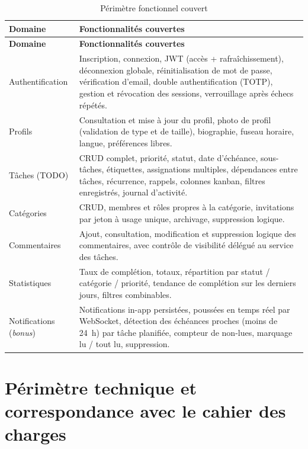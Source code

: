 \documentclass[11pt,a4paper,oneside]{report}
\begin{document}
\begin{longtable}{@{}p{4.2cm}p{10.3cm}@{}}
\caption{Périmètre fonctionnel couvert}\label{tab:perimetre}\\
\toprule
\textbf{Domaine} & \textbf{Fonctionnalités couvertes} \\
\midrule
\endfirsthead
\toprule
\textbf{Domaine} & \textbf{Fonctionnalités couvertes} \\
\midrule
\endhead
\bottomrule
\endlastfoot
Authentification &
  Inscription, connexion, JWT (accès + rafraîchissement), déconnexion globale,
  réinitialisation de mot de passe, vérification d'email, double authentification
  (TOTP), gestion et révocation des sessions, verrouillage après échecs répétés. \\
\addlinespace
Profils &
  Consultation et mise à jour du profil, photo de profil (validation de type et
  de taille), biographie, fuseau horaire, langue, préférences libres. \\
\addlinespace
Tâches (TODO) &
  CRUD complet, priorité, statut, date d'échéance, sous-tâches, étiquettes,
  assignations multiples, dépendances entre tâches, récurrence, rappels,
  colonnes kanban, filtres enregistrés, journal d'activité. \\
\addlinespace
Catégories &
  CRUD, membres et rôles propres à la catégorie, invitations par jeton à usage
  unique, archivage, suppression logique. \\
\addlinespace
Commentaires &
  Ajout, consultation, modification et suppression logique des commentaires,
  avec contrôle de visibilité délégué au service des tâches. \\
\addlinespace
Statistiques &
  Taux de complétion, totaux, répartition par statut / catégorie / priorité,
  tendance de complétion sur les derniers jours, filtres combinables. \\
\addlinespace
Notifications \newline (\emph{bonus}) &
  Notifications in-app persistées, poussées en temps réel par WebSocket,
  détection des échéances proches (moins de 24~h) par tâche planifiée,
  compteur de non-lues, marquage lu / tout lu, suppression. \\
\end{longtable}

\section{Périmètre technique et correspondance avec le cahier des charges}
\end{document}
